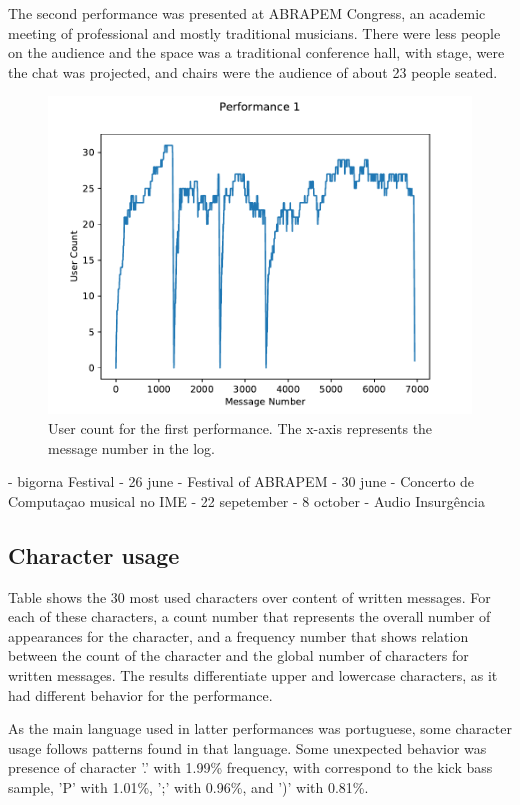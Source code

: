 \documentclass{aes2e}
\begin{document}
The second performance was presented at ABRAPEM Congress, an academic meeting of professional and mostly traditional musicians. There were less people on the audience and the space was a traditional conference hall, with stage, were the chat was projected, and chairs were the audience of about 23 people seated. 

\begin{figure}
\centering
\includegraphics{num_analysis/p1_us.pdf}
\caption{User count for the first performance. The x-axis represents the message number in the log.}
\end{figure}

- bigorna Festival - 26 june
- Festival of ABRAPEM - 30 june
- Concerto de Computaçao musical no IME - 22 sepetember
- 8 october - Audio Insurgência


\subsection{Character usage}

Table shows the 30 most used characters over content of written messages. For each of these characters, a count number that represents the overall number of appearances for the character, and a frequency number that shows relation between the count of the character and the global number of characters for written messages. The results differentiate upper and lowercase characters, as it had different behavior for the performance.

As the main language used in latter performances was portuguese, some character usage follows patterns found in that language. Some unexpected behavior was presence of character '.' with 1.99\% frequency, with correspond to the kick bass sample, 'P' with 1.01\%, ';' with 0.96\%, and ')' with 0.81\%.
\end{document}
